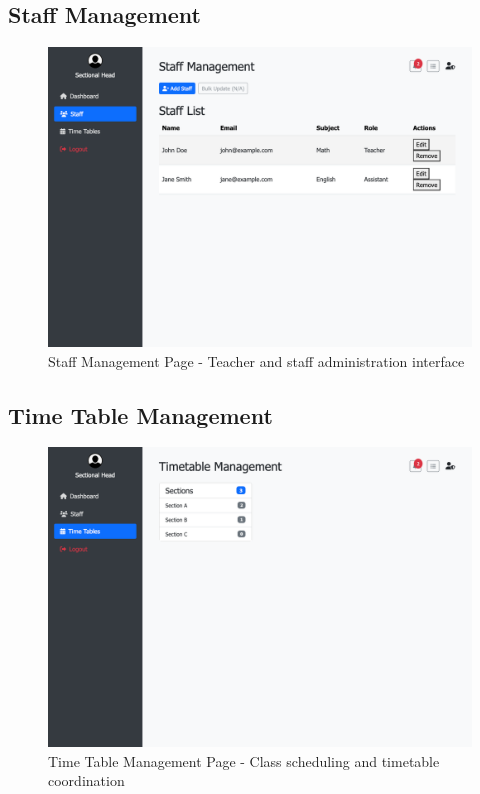 \documentclass[12pt,a4paper]{article}
\begin{document}
\subsection{Staff Management}
\begin{figure}[H]
    \centering
    \includegraphics[width=\textwidth]{sectional-head/sectionalhead-staff-management-page.png}
    \caption{Staff Management Page - Teacher and staff administration interface}
    \label{fig:sectionalhead-staff}
\end{figure}

\subsection{Time Table Management}
\begin{figure}[H]
    \centering
    \includegraphics[width=\textwidth]{sectional-head/sectionalhead-time-table-management-page.png}
    \caption{Time Table Management Page - Class scheduling and timetable coordination}
    \label{fig:sectionalhead-timetable}
\end{figure}
\end{document}
